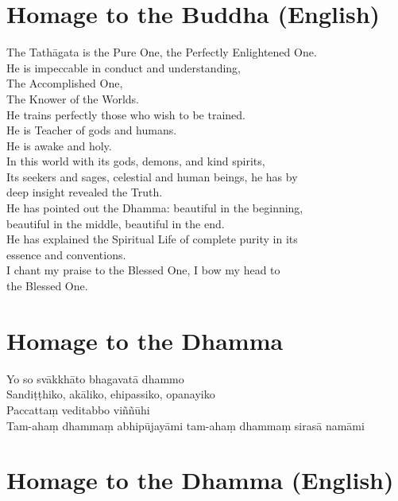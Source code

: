 \section*{Homage to the Buddha (English)}

\begin{leader}
\end{leader}

The Tathāgata is the Pure One, the Perfectly Enlightened One.\\
He is impeccable in conduct and understanding,\\
The Accomplished One,\\
The Knower of the Worlds.\\
He trains perfectly those who wish to be trained.\\
He is Teacher of gods and humans.\\
He is awake and holy.\\
In this world with its gods, demons, and kind spirits,\\
Its seekers and sages, celestial and human beings, he has by \\deep insight revealed the Truth.\\
He has pointed out the Dhamma: beautiful in the beginning, \\beautiful in the middle, beautiful in the end.\\
He has explained the Spiritual Life of complete purity in its \\essence and conventions.\\
I chant my praise to the Blessed One, I bow my head to \\the Blessed One.

\section*{Homage to the Dhamma}

\begin{leader}
\end{leader}

Yo so svākkhāto bhagavatā dhammo\\
Sandiṭṭhiko, akāliko, ehipassiko, opanayiko\\
Paccattaṃ veditabbo viññūhi\\
Tam-ahaṃ dhammaṃ abhipūjayāmi tam-ahaṃ dhammaṃ sirasā namāmi

\section*{Homage to the Dhamma (English)}

